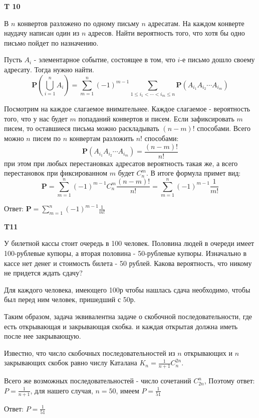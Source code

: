 \documentclass[a4paper,12pt]{article} %
\begin{document}
\begin{example}\textbf{T 10}

В $n$ конвертов разложено по одному письму $n$ адресатам. 
На каждом конверте наудачу написан один из $n$ адресов. 
Найти вероятность того, что хотя бы одно письмо пойдет по назначению.

Пусть $ A_i$ - элементарное событие, состоящее в том, что $i$-е письмо дошло своему адресату. Тогда нужно найти.
\[ \mathbf{P}(\bigcup_{i=1}^n A_i)= \sum_{m=1}^{n}(-1)^{m-1} \sum_{1 \leqslant i_{1}<\cdots<i_{m} \leqslant n}
 \mathbf{P}\left(A_{i_{1}} A_{i_{2}} \cdots A_{i_{m}}\right) \]

Посмотрим на каждое слагаемое внимательнее. Каждое слагаемое - вероятность того, что у нас будет $m$ попаданий конвертов и писем.
Если зафиксировать $m$ писем, то оставшиеся письма можно раскладывать $(n-m)!$ способами. 
Всего можно $n$ писем по $n$ конвертам разложить $ n!$ способами:
\[ \mathbf{P}\left(A_{i_{1}} A_{i_{2}}\cdots A_{i_{m}}\right)=\frac{(n-m)!}{n!} \]
при этом при любых перестановках адресатов вероятность такая же, а всего перестановок при фиксированном $m$ будет $ C_n^m$.
В итоге формула примет вид:
\[ \mathbf{P}=\sum_{m=1}^{n}(-1)^{m-1} C_n^m \frac{(n-m)!}{n!}=
\sum_{m=1}^{n}(-1)^{m-1}\frac{1}{m!} \]

Ответ: $\mathbf{P}= \sum_{m=1}^{n}(-1)^{m-1}\frac{1}{m!} $

\end{example}






\begin{example}\textbf{T11}

У билетной кассы стоит очередь в 100 человек. Половина людей в очереди имеет 100-рублевые купюры, а вторая половина - 50-рублевые купюры. 
Изначально в кассе нет денег и стоимость билета - 50 рублей. 
Какова вероятность, что никому не придется ждать сдачу?

Для каждого человека, имеющего 100р чтобы нашлась сдача необходимо, чтобы был перед ним человек, пришедший с 50р.


Таким образом, задача эквивалентна задаче о скобочной последовательности, где есть открывающая и закрывающая скобка. и каждая открытая должна иметь после нее закрывающую.


Известно, что число скобочных последовательностей из $ n$ открывающих и $ n$ закрывающих скобок равно числу Каталана $K_n = \frac{1}{n+1}C_n^{2n}$.

Всего же возможных последовательностей - число сочетаний $ C_{2n}^n$, Поэтому ответ: $P= \frac{1}{n+1}$, для нашего случая, $ n=50$, имеем $P= \frac{1}{51}$


Ответ: $P= \frac{1}{51}$


\end{example}
\end{document}
